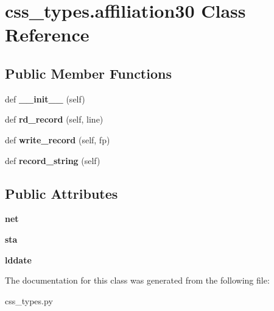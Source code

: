 \hypertarget{classcss__types_1_1affiliation30}{}\section{css\+\_\+types.\+affiliation30 Class Reference}
\label{classcss__types_1_1affiliation30}
\subsection*{Public Member Functions}
\begin{DoxyCompactItemize}
\item 
\hypertarget{classcss__types_1_1affiliation30_aa0640f194b0a5b3fa83abf806b2410ed}{}def {\bfseries \+\_\+\+\_\+init\+\_\+\+\_\+} (self)\label{classcss__types_1_1affiliation30_aa0640f194b0a5b3fa83abf806b2410ed}

\item 
\hypertarget{classcss__types_1_1affiliation30_a4773156e63a9369f536a093740150314}{}def {\bfseries rd\+\_\+record} (self, line)\label{classcss__types_1_1affiliation30_a4773156e63a9369f536a093740150314}

\item 
\hypertarget{classcss__types_1_1affiliation30_a9145503d24259950e033cbd210b319bf}{}def {\bfseries write\+\_\+record} (self, fp)\label{classcss__types_1_1affiliation30_a9145503d24259950e033cbd210b319bf}

\item 
\hypertarget{classcss__types_1_1affiliation30_aeabba6c8b709a6a30f2020b78b071f97}{}def {\bfseries record\+\_\+string} (self)\label{classcss__types_1_1affiliation30_aeabba6c8b709a6a30f2020b78b071f97}

\end{DoxyCompactItemize}
\subsection*{Public Attributes}
\begin{DoxyCompactItemize}
\item 
\hypertarget{classcss__types_1_1affiliation30_ac64dc923c7aa8025d259c95c9feef45d}{}{\bfseries net}\label{classcss__types_1_1affiliation30_ac64dc923c7aa8025d259c95c9feef45d}

\item 
\hypertarget{classcss__types_1_1affiliation30_aa60aa746603a5723bf40ae84927bfbb8}{}{\bfseries sta}\label{classcss__types_1_1affiliation30_aa60aa746603a5723bf40ae84927bfbb8}

\item 
\hypertarget{classcss__types_1_1affiliation30_a3469d6f8e23510f8226feb67f7764477}{}{\bfseries lddate}\label{classcss__types_1_1affiliation30_a3469d6f8e23510f8226feb67f7764477}

\end{DoxyCompactItemize}


The documentation for this class was generated from the following file\+:\begin{DoxyCompactItemize}
\item 
css\+\_\+types.\+py\end{DoxyCompactItemize}
